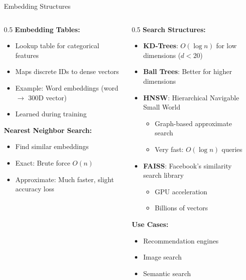\documentclass[aspectratio=169,xcolor=dvipsnames]{beamer}
\begin{document}
\begin{frame}{Embedding Structures}
  \begin{columns}
    \begin{column}{0.5\textwidth}
      \textbf{Embedding Tables:}
      \begin{itemize}
        \item Lookup table for categorical features
        \item Maps discrete IDs to dense vectors
        \item Example: Word embeddings (word $\to$ 300D vector)
        \item Learned during training
      \end{itemize}

      \vspace{0.3cm}
      \textbf{Nearest Neighbor Search:}
      \begin{itemize}
        \item Find similar embeddings
        \item Exact: Brute force $O(n)$
        \item Approximate: Much faster, slight accuracy loss
      \end{itemize}
    \end{column}

    \begin{column}{0.5\textwidth}
      \textbf{Search Structures:}
      \begin{itemize}
        \item \textbf{KD-Trees}: $O(\log n)$ for low dimensions ($d < 20$)
        \item \textbf{Ball Trees}: Better for higher dimensions
        \item \textbf{HNSW}: Hierarchical Navigable Small World
        \begin{itemize}
          \item Graph-based approximate search
          \item Very fast: $O(\log n)$ queries
        \end{itemize}
        \item \textbf{FAISS}: Facebook's similarity search library
        \begin{itemize}
          \item GPU acceleration
          \item Billions of vectors
        \end{itemize}
      \end{itemize}

      \vspace{0.3cm}
      \textbf{Use Cases:}
      \begin{itemize}
        \item Recommendation engines
        \item Image search
        \item Semantic search
      \end{itemize}
    \end{column}
  \end{columns}
\end{frame}
\end{document}
